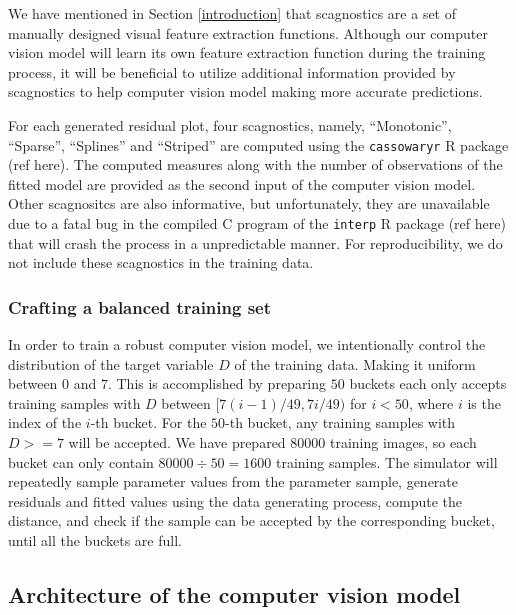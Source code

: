 \documentclass[]{interact}
\theoremstyle{plain}%
\theoremstyle{definition}
\theoremstyle{remark}
\begin{document}
We have mentioned in Section \ref{introduction} that scagnostics are a
set of manually designed visual feature extraction functions. Although
our computer vision model will learn its own feature extraction function
during the training process, it will be beneficial to utilize additional
information provided by scagnostics to help computer vision model making
more accurate predictions.

For each generated residual plot, four scagnostics, namely,
``Monotonic'', ``Sparse'', ``Splines'' and ``Striped'' are computed
using the \texttt{cassowaryr} R package (ref here). The computed
measures along with the number of observations of the fitted model are
provided as the second input of the computer vision model. Other
scagnositcs are also informative, but unfortunately, they are
unavailable due to a fatal bug in the compiled C program of the
\texttt{interp} R package (ref here) that will crash the process in a
unpredictable manner. For reproducibility, we do not include these
scagnostics in the training data.

\hypertarget{crafting-a-balanced-training-set}{%
\subsubsection{Crafting a balanced training
set}\label{crafting-a-balanced-training-set}}

In order to train a robust computer vision model, we intentionally
control the distribution of the target variable \(D\) of the training
data. Making it uniform between \(0\) and \(7\). This is accomplished by
preparing \(50\) buckets each only accepts training samples with \(D\)
between \([7(i - 1)/49, 7i/49)\) for \(i < 50\), where \(i\) is the
index of the \(i\)-th bucket. For the \(50\)-th bucket, any training
samples with \(D >= 7\) will be accepted. We have prepared 80000
training images, so each bucket can only contain
\(80000 \div 50 = 1600\) training samples. The simulator will repeatedly
sample parameter values from the parameter sample, generate residuals
and fitted values using the data generating process, compute the
distance, and check if the sample can be accepted by the corresponding
bucket, until all the buckets are full.

\hypertarget{architecture-of-the-computer-vision-model}{%
\subsection{Architecture of the computer vision
model}\label{architecture-of-the-computer-vision-model}}
\end{document}
